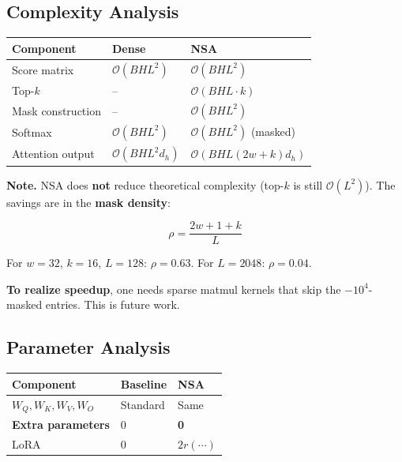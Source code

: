 \subsection{Complexity Analysis}

\begin{table}[H]
\centering
\small
\begin{tabular}{lll}
\toprule
\textbf{Component} & \textbf{Dense} & \textbf{NSA} \\
\midrule
Score matrix & $\mathcal{O}(B H L^2)$ & $\mathcal{O}(B H L^2)$ \\
Top-$k$ & -- & $\mathcal{O}(B H L \cdot k)$ \\
Mask construction & -- & $\mathcal{O}(B H L^2)$ \\
Softmax & $\mathcal{O}(B H L^2)$ & $\mathcal{O}(B H L^2)$ (masked) \\
Attention output & $\mathcal{O}(B H L^2 d_h)$ & $\mathcal{O}(B H L (2w+k) d_h)$ \\
\bottomrule
\end{tabular}
\end{table}

\textbf{Note.} NSA does \textbf{not} reduce theoretical complexity (top-$k$ is still 
$\mathcal{O}(L^2)$). The savings are in the \textbf{mask density}:

\[
\rho = \frac{2w + 1 + k}{L}
\tag{4.9}
\]

For $w = 32$, $k = 16$, $L = 128$: $\rho = 0.63$.
For $L = 2048$: $\rho = 0.04$.

\textbf{To realize speedup}, one needs sparse matmul kernels that skip the 
$-10^4$-masked entries. This is future work.

\subsection{Parameter Analysis}

\begin{table}[H]
\centering
\small
\begin{tabular}{lll}
\toprule
\textbf{Component} & \textbf{Baseline} & \textbf{NSA} \\
\midrule
$W_Q, W_K, W_V, W_O$ & Standard & Same \\
\textbf{Extra parameters} & 0 & \textbf{0} \\
LoRA & 0 & $2 r (\cdots)$ \\
\bottomrule
\end{tabular}
\end{table}

